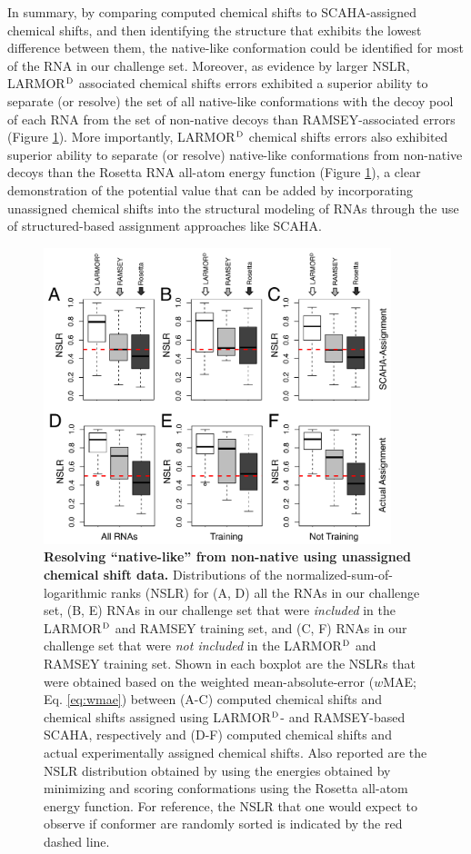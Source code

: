 \documentclass[journal=jcisd8,manuscript=article,layout=onecolumn]{achemso}
\begin{document}
In summary, by comparing computed chemical shifts to SCAHA-assigned chemical shifts, and then identifying the structure that exhibits the lowest difference between them, the native-like conformation could be identified for most of the RNA in our challenge set. Moreover, as evidence by larger NSLR, LARMOR$^{\rm D}$ associated chemical shifts errors exhibited a superior ability to separate (or resolve) the set of all native-like conformations with the decoy pool of each RNA from the set of non-native decoys than RAMSEY-associated errors (Figure \ref{fig:sensitivities}). More importantly, LARMOR$^{\rm D}$ chemical shifts errors also exhibited superior ability to separate (or resolve) native-like conformations from non-native decoys than the Rosetta RNA all-atom energy function (Figure \ref{fig:sensitivities}), a clear demonstration of the potential value that can be added by incorporating unassigned chemical shifts into the structural modeling of RNAs through the use of structured-based assignment approaches like SCAHA.

\begin{figure}[h!]
  \centering
       \includegraphics[width=0.9\textwidth]{figure_4}
  \caption{\textbf{Resolving ``native-like'' from non-native using unassigned chemical shift data.} Distributions of the normalized-sum-of-logarithmic ranks (NSLR) for (A, D) all the RNAs in our challenge set, (B, E) RNAs in our challenge set that were \textit{included} in the LARMOR$^{\rm D}$ and RAMSEY training set, and (C, F) RNAs in our challenge set that were \textit{not included} in the LARMOR$^{\rm D}$ and RAMSEY training set. Shown in each boxplot are the NSLRs that were obtained based on the weighted mean-absolute-error ($w$MAE; Eq. \ref{eq:wmae}) between (A-C) computed chemical shifts and chemical shifts assigned using LARMOR$^{\rm D}$- and RAMSEY-based SCAHA, respectively and (D-F) computed chemical shifts and actual experimentally assigned chemical shifts.  Also reported are the NSLR distribution obtained by using the energies obtained by minimizing and scoring conformations using the Rosetta all-atom energy function\cite{alford2017rosetta}. For reference, the NSLR that one would expect to observe if conformer are randomly sorted is indicated by the red dashed line.}
  \label{fig:sensitivities}
\end{figure}
\end{document}
